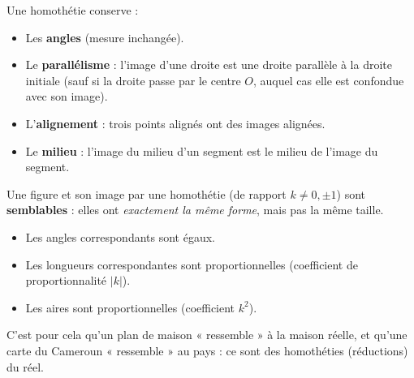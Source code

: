 \documentclass[11pt]{article}
\begin{document}
\begin{propriete}
Une homothétie conserve :
\begin{itemize}
    \item Les \textbf{angles} (mesure inchangée).
    \item Le \textbf{parallélisme} : l'image d'une droite est une droite parallèle à la droite initiale (sauf si la droite passe par le centre $O$, auquel cas elle est confondue avec son image).
    \item L'\textbf{alignement} : trois points alignés ont des images alignées.
    \item Le \textbf{milieu} : l'image du milieu d'un segment est le milieu de l'image du segment.
\end{itemize}
\end{propriete}

\begin{aretenir}
Une figure et son image par une homothétie (de rapport $k \neq 0, \pm 1$) sont \textbf{semblables} : elles ont \emph{exactement la même forme}, mais pas la même taille.
\begin{itemize}
    \item Les angles correspondants sont égaux.
    \item Les longueurs correspondantes sont proportionnelles (coefficient de proportionnalité $|k|$).
    \item Les aires sont proportionnelles (coefficient $k^2$).
\end{itemize}
C'est pour cela qu'un plan de maison « ressemble » à la maison réelle, et qu'une carte du Cameroun « ressemble » au pays : ce sont des homothéties (réductions) du réel.
\end{aretenir}
\end{document}
